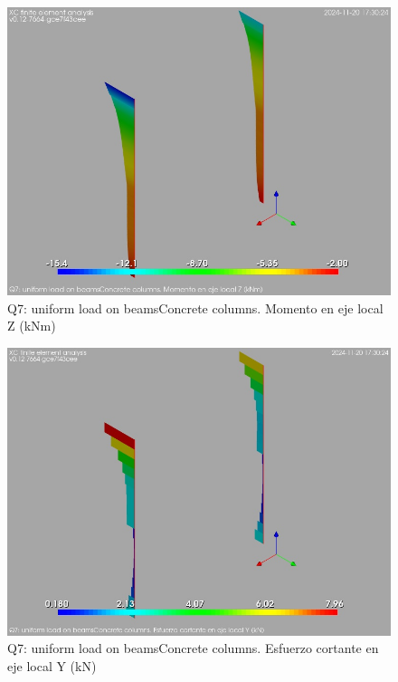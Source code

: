 \begin{figure}[ht]
\begin{center}
\includegraphics[width=\linewidth]{results/graphics/resSimplLC/qunifBeamscolumnZconcrMz.png}
\caption{Q7: uniform load on beamsConcrete columns. Momento en eje local Z (kNm)}
\label{qunifBeamscolumnZconcrMz}
\end{center}
\end{figure}
\begin{figure}[ht]
\begin{center}
\includegraphics[width=\linewidth]{results/graphics/resSimplLC/qunifBeamscolumnZconcrVy.png}
\caption{Q7: uniform load on beamsConcrete columns. Esfuerzo cortante en eje local Y (kN)}
\label{qunifBeamscolumnZconcrVy}
\end{center}
\end{figure}
